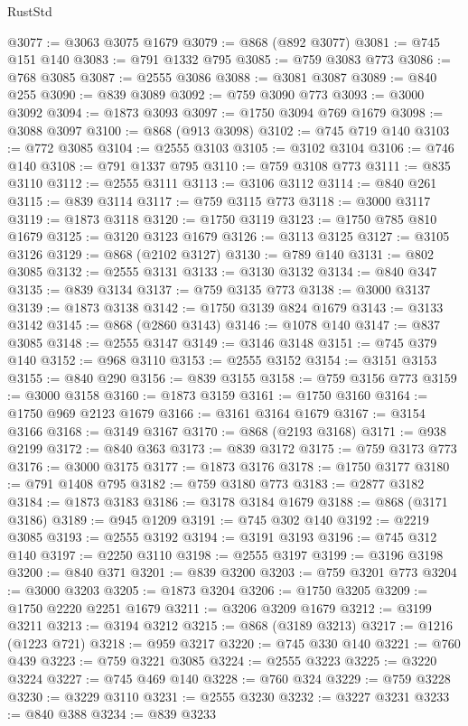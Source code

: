 \begin{lexlean}{RustStd}
\begin{coremodule}
@3077 := @3063 @3075 @1679
@3079 := @868 (@892 @3077)
@3081 := @745 @151 @140
@3083 := @791 @1332 @795
@3085 := @759 @3083 @773
@3086 := @768 @3085
@3087 := @2555 @3086
@3088 := @3081 @3087
@3089 := @840 @255
@3090 := @839 @3089
@3092 := @759 @3090 @773
@3093 := @3000 @3092
@3094 := @1873 @3093
@3097 := @1750 @3094 @769 @1679
@3098 := @3088 @3097
@3100 := @868 (@913 @3098)
@3102 := @745 @719 @140
@3103 := @772 @3085
@3104 := @2555 @3103
@3105 := @3102 @3104
@3106 := @746 @140
@3108 := @791 @1337 @795
@3110 := @759 @3108 @773
@3111 := @835 @3110
@3112 := @2555 @3111
@3113 := @3106 @3112
@3114 := @840 @261
@3115 := @839 @3114
@3117 := @759 @3115 @773
@3118 := @3000 @3117
@3119 := @1873 @3118
@3120 := @1750 @3119
@3123 := @1750 @785 @810 @1679
@3125 := @3120 @3123 @1679
@3126 := @3113 @3125
@3127 := @3105 @3126
@3129 := @868 (@2102 @3127)
@3130 := @789 @140
@3131 := @802 @3085
@3132 := @2555 @3131
@3133 := @3130 @3132
@3134 := @840 @347
@3135 := @839 @3134
@3137 := @759 @3135 @773
@3138 := @3000 @3137
@3139 := @1873 @3138
@3142 := @1750 @3139 @824 @1679
@3143 := @3133 @3142
@3145 := @868 (@2860 @3143)
@3146 := @1078 @140
@3147 := @837 @3085
@3148 := @2555 @3147
@3149 := @3146 @3148
@3151 := @745 @379 @140
@3152 := @968 @3110
@3153 := @2555 @3152
@3154 := @3151 @3153
@3155 := @840 @290
@3156 := @839 @3155
@3158 := @759 @3156 @773
@3159 := @3000 @3158
@3160 := @1873 @3159
@3161 := @1750 @3160
@3164 := @1750 @969 @2123 @1679
@3166 := @3161 @3164 @1679
@3167 := @3154 @3166
@3168 := @3149 @3167
@3170 := @868 (@2193 @3168)
@3171 := @938 @2199
@3172 := @840 @363
@3173 := @839 @3172
@3175 := @759 @3173 @773
@3176 := @3000 @3175
@3177 := @1873 @3176
@3178 := @1750 @3177
@3180 := @791 @1408 @795
@3182 := @759 @3180 @773
@3183 := @2877 @3182
@3184 := @1873 @3183
@3186 := @3178 @3184 @1679
@3188 := @868 (@3171 @3186)
@3189 := @945 @1209
@3191 := @745 @302 @140
@3192 := @2219 @3085
@3193 := @2555 @3192
@3194 := @3191 @3193
@3196 := @745 @312 @140
@3197 := @2250 @3110
@3198 := @2555 @3197
@3199 := @3196 @3198
@3200 := @840 @371
@3201 := @839 @3200
@3203 := @759 @3201 @773
@3204 := @3000 @3203
@3205 := @1873 @3204
@3206 := @1750 @3205
@3209 := @1750 @2220 @2251 @1679
@3211 := @3206 @3209 @1679
@3212 := @3199 @3211
@3213 := @3194 @3212
@3215 := @868 (@3189 @3213)
@3217 := @1216 (@1223 @721)
@3218 := @959 @3217
@3220 := @745 @330 @140
@3221 := @760 @439
@3223 := @759 @3221 @3085
@3224 := @2555 @3223
@3225 := @3220 @3224
@3227 := @745 @469 @140
@3228 := @760 @324
@3229 := @759 @3228
@3230 := @3229 @3110
@3231 := @2555 @3230
@3232 := @3227 @3231
@3233 := @840 @388
@3234 := @839 @3233

\end{coremodule}
\end{lexlean}
